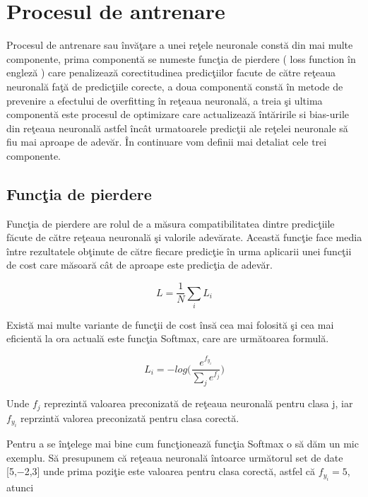 \section{Procesul de antrenare}

Procesul de antrenare sau \^{i}nv\u{a}\c{t}are a unei re\c{t}ele neuronale const\u{a} din mai multe componente, prima component\u{a} se numeste func\c{t}ia de pierdere ( loss function \^{i}n englez\u{a} ) care penalizeaz\u{a} corectitudinea predic\c{t}iilor facute de c\u{a}tre re\c{t}eaua neuronal\u{a} fa\c{t}\u{a} de predic\c{t}iile corecte, a doua component\u{a} const\u{a} \^{i}n metode de prevenire a efectului de overfitting \^{i}n re\c{t}eaua neuronal\u{a}, a treia \c{s}i ultima component\u{a} este procesul de optimizare care actualizeaz\u{a} \^{i}nt\u{a}ririle si bias-urile din re\c{t}eaua neuronal\u{a} astfel \^{i}nc\^{a}t urmatoarele predic\c{t}ii ale re\c{t}elei neuronale s\u{a} fiu mai aproape de adev\u{a}r. \^{I}n continuare vom definii mai detaliat cele trei componente.

\subsection{Func\c{t}ia de pierdere}

Func\c{t}ia de pierdere are rolul de a m\u{a}sura compatibilitatea dintre predic\c{t}iile f\u{a}cute de c\u{a}tre re\c{t}eaua neuronal\u{a} \c{s}i valorile adev\u{a}rate. Aceast\u{a} func\c{t}ie face media \^{i}ntre rezultatele ob\c{t}inute de c\u{a}tre fiecare predic\c{t}ie \^{i}n urma aplicarii unei func\c{t}ii de cost care m\u{a}soar\u{a} c\^{a}t de aproape este predic\c{t}ia de adev\u{a}r.

$$L = \frac{1}{N} \sum_i L_i $$

Exist\u{a} mai multe variante de func\c{t}ii de cost \^{i}ns\u{a} cea mai folosit\u{a} \c{s}i cea mai eficient\u{a} la ora actual\u{a} este func\c{t}ia Softmax, care are urm\u{a}toarea formul\u{a}.

$$ L_i = - log \bigg(\frac{e^{f_y_i}}{\sum_j e^{f_j}}\bigg)$$

Unde $f_j$ reprezint\u{a} valoarea preconizat\u{a} de re\c{t}eaua neuronal\u{a} pentru clasa j, iar $f_y_i$ reprzint\u{a} valorea preconizat\u{a} pentru clasa corect\u{a}.

\par

Pentru a se \^{i}n\c{t}elege mai bine cum func\c{t}ioneaz\u{a} func\c{t}ia Softmax o s\u{a} d\u{a}m un mic exemplu. S\u{a} presupunem c\u{a} re\c{t}eaua neuronal\u{a} \^{i}ntoarce urm\u{a}torul set de date [5,−2,3] unde prima pozi\c{t}ie este valoarea pentru clasa corect\u{a}, astfel c\u{a} $f_y_i = 5$, atunci 

